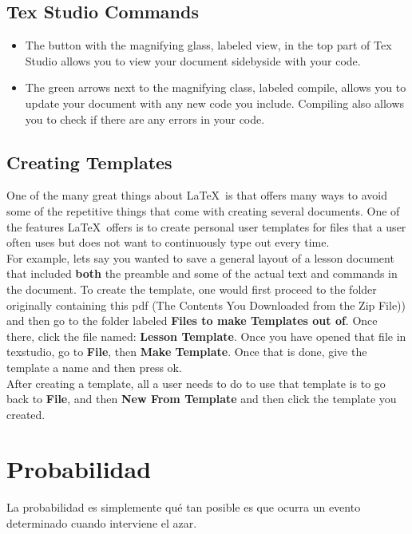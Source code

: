 \documentclass[12pt,hidelinks]{article}
\begin{document}
	\subsection{Tex Studio Commands}
		\begin{itemize}
			\item The button with the magnifying glass, labeled view, in the top part of Tex Studio allows you to view your document sidebyside with your code.
			\item The green arrows next to the magnifying class, labeled compile, allows you to update your document with any new code you include. Compiling also allows you to check if there are any errors in your code.  
		\end{itemize}
	\subsection{Creating Templates}
		One of the many great things about \LaTeX\ is that offers many ways to avoid some of the repetitive things that come with creating several documents. One of the features \LaTeX\ offers is to create personal user templates for files that a user often uses but does not want to continuously type out every time.\\
		For example, lets say you wanted to save a general layout of a lesson document that included \textbf{both} the preamble and some of the actual text and commands in the document. 
		To create the template, one would first proceed to the folder originally containing this pdf (The Contents You Downloaded from the Zip File)) and then go to the folder labeled \textbf{Files to make Templates out of}. Once there, click the file named: \textbf{Lesson Template}. Once you have opened that file in texstudio, go to \textbf{File}, then \textbf{Make Template}. Once that is done, give the template a name and then press ok.\\
		After creating a template, all a user needs to do to use that template is to go back to \textbf{File}, and then \textbf{New From Template} and then click the template you created.
	\vspace{-1.5mm}
\newpage

\section{Probabilidad}
\vspace{10.5cm}
La probabilidad es simplemente qué tan posible es que ocurra un evento determinado cuando interviene el azar.
\end{document}
